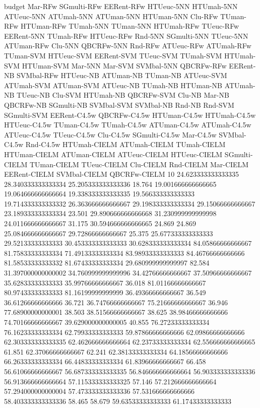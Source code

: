 budget Mar-RFw SGmulti-RFw EERent-RFw HTUeuc-5NN HTUmah-5NN ATUeuc-5NN ATUmah-5NN ATUman-5NN HTUman-5NN Clu-RFw TUman-RFw HTUman-RFw TUmah-5NN TUman-5NN HTUmah-RFw TUeuc-RFw EERent-5NN TUmah-RFw HTUeuc-RFw Rnd-5NN SGmulti-5NN TUeuc-5NN ATUman-RFw Clu-5NN QBCRFw-5NN Rnd-RFw ATUeuc-RFw ATUmah-RFw TUman-SVM HTUeuc-SVM EERent-SVM TUeuc-SVM TUmah-SVM HTUmah-SVM HTUman-SVM Mar-5NN Mar-SVM SVMbal-5NN QBCRFw-RFw EERent-NB SVMbal-RFw HTUeuc-NB ATUman-NB TUman-NB ATUeuc-SVM ATUmah-SVM ATUman-SVM ATUeuc-NB TUmah-NB HTUman-NB ATUmah-NB TUeuc-NB Clu-SVM HTUmah-NB QBCRFw-SVM Clu-NB Mar-NB QBCRFw-NB SGmulti-NB SVMbal-SVM SVMbal-NB Rnd-NB Rnd-SVM SGmulti-SVM EERent-C4.5w QBCRFw-C4.5w HTUman-C4.5w HTUmah-C4.5w HTUeuc-C4.5w TUman-C4.5w TUmah-C4.5w ATUman-C4.5w ATUmah-C4.5w ATUeuc-C4.5w TUeuc-C4.5w Clu-C4.5w SGmulti-C4.5w Mar-C4.5w SVMbal-C4.5w Rnd-C4.5w HTUmah-CIELM ATUmah-CIELM TUmah-CIELM HTUman-CIELM ATUman-CIELM ATUeuc-CIELM HTUeuc-CIELM SGmulti-CIELM TUman-CIELM TUeuc-CIELM Clu-CIELM Rnd-CIELM Mar-CIELM EERent-CIELM SVMbal-CIELM QBCRFw-CIELM
10 24.623333333333335 28.340333333333334 25.205333333333336 18.764 19.001666666666665 19.064666666666664 19.338333333333335 19.566333333333333 19.714333333333332 26.363666666666667 29.198333333333334 29.15066666666667 23.189333333333334 23.501 29.890666666666668 31.230999999999998 24.011666666666667 31.175 30.594666666666665 24.869 24.869 25.084666666666667 29.72866666666667 25.375 25.677333333333333 29.52133333333333 30.453333333333333 30.628333333333334 84.05866666666667 81.75833333333334 71.49133333333334 83.98933333333333 84.46766666666666 81.58533333333332 81.67433333333334 29.680999999999997 82.584 31.397000000000002 34.760999999999996 34.42766666666667 37.50966666666667 35.62833333333333 35.99766666666667 36.018 81.01166666666667 80.97433333333333 81.16199999999999 36.49366666666667 36.549 36.61266666666666 36.721 36.74766666666667 75.21666666666667 36.946 77.68900000000001 38.503 38.51566666666667 38.625 38.98466666666666 74.70166666666667 39.629000000000005 40.855 76.27233333333334 76.16233333333334 62.79933333333333 59.87866666666666 62.09866666666666 62.303333333333335 62.462666666666664 62.23733333333334 62.556666666666665 61.851 62.37066666666667 62.241 62.38133333333334 64.18566666666666 66.26333333333334 66.44833333333334 61.83966666666667 66.458 56.61066666666667 56.687333333333335 56.846666666666664 56.903333333333336 56.913666666666664 57.115333333333325 57.146 57.212666666666664 57.294000000000004 57.473333333333336 57.531666666666666 58.403333333333336 58.465 58.679 59.63533333333333 61.17433333333333
